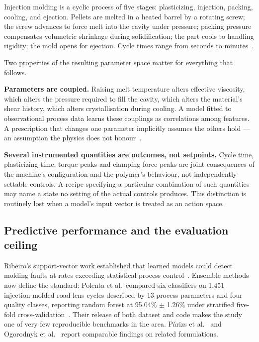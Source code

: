 \documentclass[11pt,a4paper]{article}
\begin{document}
Injection molding is a cyclic process of five stages: plasticizing, injection, packing, cooling, and ejection. Pellets are melted in a heated barrel by a rotating screw; the screw advances to force melt into the cavity under pressure; packing pressure compensates volumetric shrinkage during solidification; the part cools to handling rigidity; the mold opens for ejection. Cycle times range from seconds to minutes~\cite{kazmer2016,rosato2000}.

Two properties of the resulting parameter space matter for everything that follows.

\textbf{Parameters are coupled.} Raising melt temperature alters effective viscosity, which alters the pressure required to fill the cavity, which alters the material's shear history, which alters crystallisation during cooling. A model fitted to observational process data learns these couplings as correlations among features. A prescription that changes one parameter implicitly assumes the others hold --- an assumption the physics does not honour~\cite{zhao2020}.

\textbf{Several instrumented quantities are outcomes, not setpoints.} Cycle time, plasticizing time, torque peaks and clamping-force peaks are joint consequences of the machine's configuration and the polymer's behaviour, not independently settable controls. A recipe specifying a particular combination of such quantities may name a state no setting of the actual controls produces. This distinction is routinely lost when a model's input vector is treated as an action space.

\subsection{Predictive performance and the evaluation ceiling}

Ribeiro's support-vector work established that learned models could detect molding faults at rates exceeding statistical process control~\cite{ribeiroB2005}. Ensemble methods now define the standard: Polenta et al.\ compared six classifiers on 1{,}451 injection-molded road-lens cycles described by 13 process parameters and four quality classes, reporting random forest at 95.04\% $\pm$ 1.26\% under stratified five-fold cross-validation~\cite{polenta2022}. Their release of both dataset and code makes the study one of very few reproducible benchmarks in the area. P\'{a}rizs et al.~\cite{parizs2022} and Ogorodnyk et al.~\cite{ogorodnyk2019} report comparable findings on related formulations.
\end{document}
